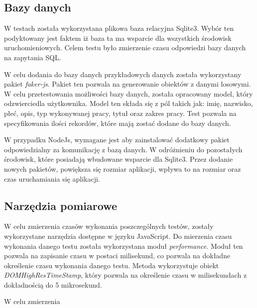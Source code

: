 \subsection{Bazy danych}
W testach została wykorzystana plikowa baza relacyjna Sqlite3. Wybór ten podyktowany jest faktem iż baza ta ma wsparcie dla wszystkich środowisk uruchomieniowych. Celem testu było zmierzenie czasu odpowiedzi bazy danych na zapytania SQL. 

W celu dodania do bazy danych przykładowych danych została wykorzystany pakiet \textit{faker-js}. Pakiet ten pozwala na generowanie obiektów z danymi losowymi. W celu przetestowania możliwości bazy danych, została opracowany model, który odzwierciedla użytkownika. Model ten składa się z pól takich jak: imię, nazwisko, płeć, opis, typ wykonywanej pracy, tytuł oraz zakres pracy. Test pozwala na specyfikowania ilości rekordów, które mają zostać dodane do bazy danych.

W przypadku NodeJs, wymagane jest aby zainstalować dodatkowy pakiet odpowiedzialny za komunikację z bazą danych. W odróżnieniu do pozostałych środowisk, które posiadają wbudowane wsparcie dla Sqlite3. Przez dodanie nowych pakietów, powiększa się rozmiar aplikacji, wpływa to na rozmiar oraz czas uruchamiania się aplikacji.

\subsection{Narzędzia pomiarowe}
W celu zmierzenia czasów wykonania poszczególnych testów, zostały wykorzystane narzędzia dostępne w języku JavaScript. Do mierzenia czasu wykonania danego testu została wykorzystana moduł \textit{performance}. Moduł ten pozwala na zapisanie czasu w postaci milisekund, co pozwala na dokładne określenie czasu wykonania danego testu. Metoda wykorzystuje obiekt \textit{DOMHighResTimeStamp}, który pozwala na określenie czasu w milisekundach z dokładnością do 5 mikrosekund.

W celu zmierzenia 